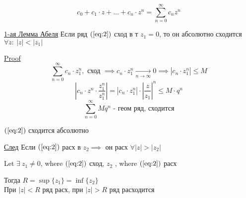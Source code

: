 \documentclass[a4paper]{article}
\begin{document}
\begin{tcolorbox}
\begin{equation}
    c_0 + c_1 \cdot z + \dots + c_n \cdot z^{n} = \sum_{n=0}^{\infty} c_n z^{n}
    \label{eq:2}
\end{equation}

\underline{1-ая Лемма Абеля} Если ряд $ (\ref{eq:2}) $ сход в т $ z_1 = 0 $, то
он абсолютно сходится $ \forall z: \ |z| < | z_1 | $ 

\underline{Proof}
\[
    \sum_{n=0}^{\infty} c_n \cdot z_1^{n}, \text{ сход } \implies c_n \cdot z_1^{n}
    \xrightarrow[n \to \infty]{} 0 \implies | c_n \cdot z_1^{n} | \leq M
\]
\[
    \left| c_n \cdot z^{n} \cdot \frac{z_1^{n}}{z_1^{n}} \right| = 
    |c_n \cdot z_1^n | \cdot \left| \frac{z}{z_1} \right|^{n} \leq M \cdot q^{n}
\]
\[
    \sum_{n=0}^{\infty} M q^{n} \text{ - геом ряд, сходится}
\]

$ (\ref{eq:2}) $ сходится абсолютно

\underline{След} Если $ (\ref{eq:2}) $ расх в $ z_2 \implies $ он расх $ \forall |z|
> |z_2|$ 

Let $ \exists \ z_1 \neq 0 $, where $ (\ref{eq:2}) $ сход, $ z_2 $  , where $ (\ref{eq:2}) $ расх

Тогда $ R = \sup \{ z_1 \} = \inf \{ z_2 \} $\\
При $ |z| < R $ ряд расх, при $ |z| > R $ ряд расходится
\end{tcolorbox}
\end{document}
